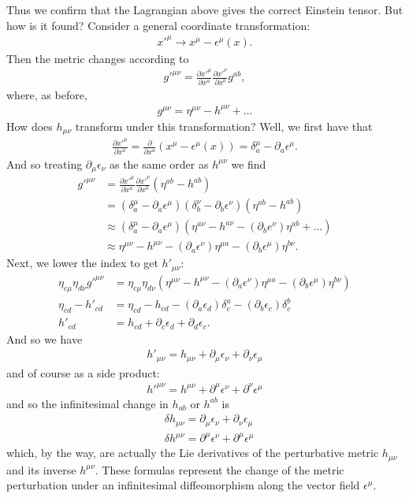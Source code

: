 \documentclass{book}
\theoremstyle{definition}
\newcommand{\p}{\partial}
\newcommand{\nn}{\nonumber}
\newcommand{\f}[2]{\frac{#1}{#2}}
\newcommand{\lp}{\left(}
\newcommand{\rp}{\right)}
\begin{document}
Thus we confirm that the Lagrangian above gives the correct Einstein tensor. But how is it found? Consider a general coordinate transformation:
\begin{align}
x'^\mu \to x^\mu - \epsilon^\mu(x).
\end{align}
Then the metric changes according to 
\begin{align}
g'^{\mu\nu} = \f{\p x'^\mu}{\p x^a} \f{\p x'^\nu}{\p x^b} g^{ab},
\end{align}
where, as before,
\begin{align}
g^{\mu\nu} = \eta^{\mu\nu} - h^{\mu\nu} +\dots
\end{align}
How does $h_{\mu\nu}$ transform under this transformation? Well, we first have that
\begin{align}
\f{\p x'^\mu}{\p x^a}= \f{\p}{\p x^a} (x^\mu - \epsilon^\mu(x)) = \delta^\mu_a - \p_a \epsilon^\mu.
\end{align}
And so treating $\p_\mu \epsilon_\nu$ as the same order as $h^{\mu\nu}$ we find
\begin{align}
g'^{\mu\nu} &= \f{\p x'^\mu}{\p x^a} \f{\p x'^\nu}{\p x^b}\lp \eta^{ab} - h^{ab} \rp\nn\\
&= (\delta^\mu_a - \p_a\epsilon^\mu)(\delta^\nu_b - \p_b\epsilon^\nu)\lp \eta^{ab} - h^{ab} \rp\nn\\
&\approx (\delta^\mu_a - \p_a\epsilon^\mu)(\eta^{a\nu} - h^{a\nu} - (\p_b e^\nu)\eta^{ab}+\dots\nn)\\
&\approx \eta^{\mu\nu} - h^{\mu\nu} - (\p_a \epsilon^\nu)\eta^{\mu a} - (\p_b \epsilon^\mu)\eta^{b\nu}.
\end{align}
Next, we lower the index to get $h'_{\mu\nu}$:
\begin{align}
\eta_{c\mu}\eta_{d\nu}g'^{\mu\nu} &= \eta_{c\mu}\eta_{d\nu}\lp \eta^{\mu\nu} - h^{\mu\nu} - (\p_a \epsilon^\nu)\eta^{\mu a} - (\p_b \epsilon^\mu)\eta^{b\nu} \rp\nn\\
\eta_{cd} - h'_{cd} &= \eta_{cd} - h_{cd} - (\p_a \epsilon_d)\delta^a_c - (\p_b\epsilon_c)\delta^b_c\nn\\
h'_{cd} &= h_{cd} + \p_c \epsilon_d +  \p_d \epsilon_c. 
\end{align}
And so we have
\begin{align}
\boxed{h'_{\mu\nu}= h_{\mu\nu} + \p_\mu \epsilon_\nu + \p_\nu \epsilon_\mu}
\end{align}
and of course as a side product:
\begin{align}
\boxed{h'^{\mu\nu} = h^{\mu\nu} + \p^\mu \epsilon^\nu + \p^\nu \epsilon^\mu}
\end{align}
and so the infinitesimal change in $h_{ab}$ or $h^{ab}$ is
\begin{align}
&\boxed{\delta h_{\mu\nu} = \p_\mu \epsilon_\nu + \p_\nu \epsilon_\mu}\\
&\boxed{\delta h^{\mu\nu} = \p^\mu \epsilon^\nu + \p^\mu \epsilon^\mu}
\end{align}
which, by the way, are actually the Lie derivatives of the perturbative metric $h_{\mu\nu}$ and its inverse $h^{\mu\nu}$. These formulas represent the change of the metric perturbation under an infinitesimal diffeomorphism along the vector field $\epsilon^\mu$. \\ 
\end{document}
